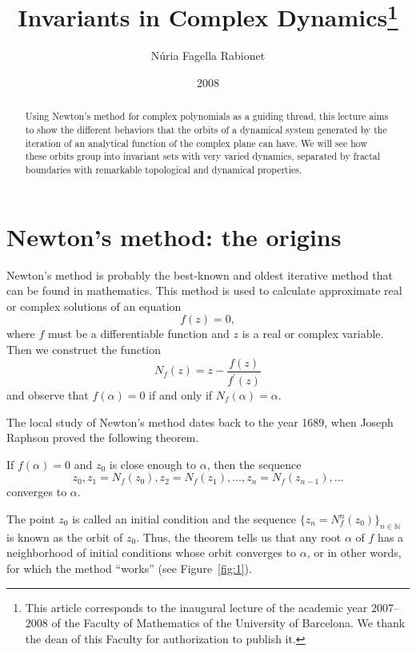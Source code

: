 \documentclass[12pt, a4paper]{article}
\title{Invariants in Complex Dynamics\thanks{This article corresponds
to the inaugural lecture of the academic year 2007--2008 of the Faculty of
Mathematics of the University of Barcelona. We thank the dean of this Faculty
for authorization to publish it.}}
\author{Núria Fagella Rabionet}
\date{2008}
\begin{document}
\maketitle

\begin{abstract}
Using Newton's method for complex polynomials as a guiding thread, this lecture
aims to show the different behaviors that the orbits of a dynamical system
generated by the iteration of an analytical function of the complex plane can
have. We will see how these orbits group into invariant sets with very varied
dynamics, separated by fractal boundaries with remarkable topological and
dynamical properties.
\end{abstract}

\section{Newton's method: the origins}

Newton's method is probably the best-known and oldest iterative method that can
be found in mathematics. This method is used to calculate approximate real or
complex solutions of an equation
\begin{equation*}
    f(z)=0,
\end{equation*}
where $f$ must be a differentiable function and $z$ is a real or complex
variable. Then we construct the function
\begin{equation*}
    N_{f}(z)=z-\frac{f(z)}{f^{\prime}(z)}
\end{equation*}
and observe that $f(\alpha)=0$ if and only if $N_{f}(\alpha)=\alpha$.

The local study of Newton's method dates back to the year 1689, when Joseph
Raphson proved the following theorem.

\begin{theorem}
If $f(\alpha)=0$ and $z_{0}$ is close enough to $\alpha$, then the sequence
\begin{equation*}
    z_{0}, z_{1}=N_{f}(z_{0}), z_{2}=N_{f}(z_{1}), \dots, z_{n}=N_{f}(z_{n-1}), \dots
\end{equation*}
converges to $\alpha$.
\end{theorem}

The point $z_{0}$ is called an initial condition and the sequence
$\{z_{n}=N_{f}^{n}(z_{0})\}_{n\in\mathbb{N}}$ is known as the orbit of $z_{0}$.
Thus, the theorem tells us that any root $\alpha$ of $f$ has a neighborhood of
initial conditions whose orbit converges to $\alpha$, or in other words, for
which the method ``works'' (see Figure~\ref{fig:1}).
\end{document}
